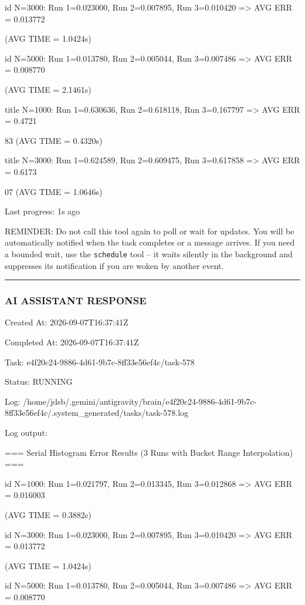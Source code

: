 \documentclass[11pt,a4paper]{article}
\begin{document}
id N=3000: Run 1=0.023000, Run 2=0.007895, Run 3=0.010420 => AVG ERR = 0.013772

(AVG TIME = 1.0424s)

id N=5000: Run 1=0.013780, Run 2=0.005044, Run 3=0.007486 => AVG ERR = 0.008770

(AVG TIME = 2.1461s)

title N=1000: Run 1=0.630636, Run 2=0.618118, Run 3=0.167797 => AVG ERR = 0.4721

83 (AVG TIME = 0.4320s)

title N=3000: Run 1=0.624589, Run 2=0.609475, Run 3=0.617858 => AVG ERR = 0.6173

07 (AVG TIME = 1.0646s)


Last progress: 1s ago



REMINDER: Do not call this tool again to poll or wait for updates. You will be automatically notified when the task completes or a message arrives. If you need a bounded wait, use the \texttt{schedule} tool -- it waits silently in the background and suppresses its notification if you are woken by another event.


\hrule

\subsubsection{AI ASSISTANT RESPONSE}

Created At: 2026-09-07T16:37:41Z

Completed At: 2026-09-07T16:37:41Z

Task: e4f20c24-9886-4d61-9b7c-8ff33e56ef4c/task-578

Status: RUNNING

Log: /home/jdsb/.gemini/antigravity/brain/e4f20c24-9886-4d61-9b7c-8ff33e56ef4c/.system\_generated/tasks/task-578.log

Log output:

=== Serial Histogram Error Results (3 Runs with Bucket Range Interpolation) ===

id N=1000: Run 1=0.021797, Run 2=0.013345, Run 3=0.012868 => AVG ERR = 0.016003

(AVG TIME = 0.3882s)

id N=3000: Run 1=0.023000, Run 2=0.007895, Run 3=0.010420 => AVG ERR = 0.013772

(AVG TIME = 1.0424s)

id N=5000: Run 1=0.013780, Run 2=0.005044, Run 3=0.007486 => AVG ERR = 0.008770
\end{document}

